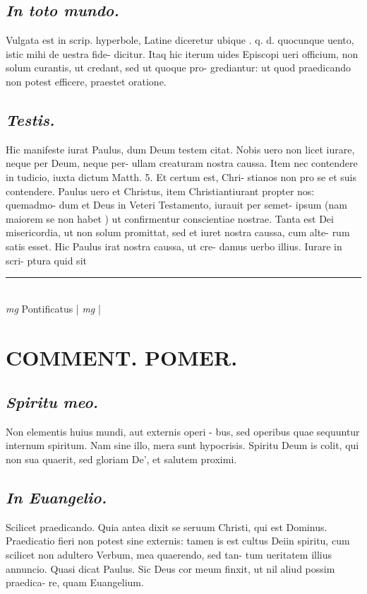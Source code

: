 \documentclass{article}
\begin{document}
\begin{pages}
\subsection*{\textit{In toto mundo. }}\pstart Vulgata est in scrip. hyperbole, Latine diceretur ubique . q. d. quocunque uento, istic mihi de uestra fide- dicitur. Itaq hic iterum uides Episcopi ueri officium, non solum curantis, ut credant, sed ut quoque pro- grediantur: ut quod praedicando non potest efficere, praestet oratione.  \pend
{}
{}
\subsection*{\textit{Testis. }}\pstart Hic manifeste iurat Paulus, dum Deum testem citat.  Nobis uero non licet iurare, neque per Deum, neque per- ullam creaturam nostra caussa. Item nec contendere in tudicio, iuxta dictum Matth. 5. Et certum est, Chri- stianos non pro se et suis contendere. Paulus uero et Christus, item Christiantiurant propter nos: quemadmo- dum et Deus in Veteri Testamento, iurauit per semet- ipsum (nam maiorem se non habet ) ut confirmentur conscientiae nostrae. Tanta est Dei misericordia, ut non solum promittat, sed et iuret nostra caussa, cum alte- rum satis esset. Hic Paulus irat nostra caussa, ut cre- damus uerbo illius. Iurare in scri- ptura quid sit  \pend
\vspace{0.5cm}\noindent
\vspace{0.2cm}\rule{1cm}{0.2pt}\\ 
\hspace{0.2cm}\textit{mg}
\footnotesize Pontificatus 
\normalsize| 
\hspace{0.2cm}\textit{mg}
\footnotesize 
\normalsize| 
\section*{COMMENT. POMER.  }
{}
\subsection*{\textit{Spiritu meo. }}\pstart Non elementis huius mundi, aut externis operi - bus, sed operibus quae sequuntur internum spiritum.  Nam sine illo, mera sunt hypocrisis. Spiritu Deum is colit, qui non sua quaerit, sed gloriam De', et salutem proximi.   \pend
{}
{}
\subsection*{\textit{In Euangelio. }}\pstart Scilicet praedicando. Quia antea dixit se seruum Christi, qui est Dominus. Praedicatio fieri non potest sine externis: tamen is est cultus Deiin spiritu, cum scilicet non adultero Verbum, mea quaerendo, sed tan- tum ueritatem illius annuncio. Quasi dicat Paulus.  Sic Deus cor meum finxit, ut nil aliud possim praedica- re, quam Euangelium.   \pend
{}
{}

\end{pages}
\end{document}
